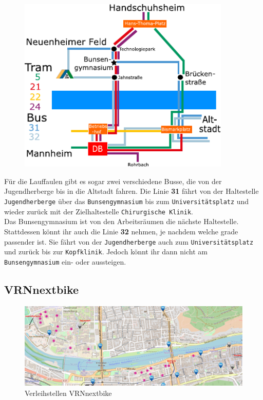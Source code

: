 \begin{figure}[t]
\centering
\includegraphics[width=0.9\textwidth]{media/vrn.pdf}
\end{figure}

Für die Lauffaulen gibt es sogar zwei verschiedene Busse, die von der Jugendherberge bis in die Altstadt fahren. Die Linie \textbf{31} fährt von der Haltestelle \texttt{Jugendherberge} über das \texttt{Bunsengymnasium} bis zum \texttt{Universitätsplatz} und wieder zurück mit der Zielhaltestelle \texttt{Chirurgische Klinik}.\\Das Bunsengymnasium ist von den Arbeitsräumen die nächste Haltestelle. Stattdessen könnt ihr auch die Linie \textbf{32} nehmen, je nachdem welche grade passender ist. Sie fährt von der \texttt{Jugendherberge} auch zum \texttt{Universitätsplatz} und zurück bis zur \texttt{Kopfklinik}. Jedoch könnt ihr dann nicht am \texttt{Bunsengymnasium} ein- oder aussteigen.

\subsection{VRNnextbike}

\begin{figure}[t]
  \includegraphics[width=1.0\textwidth]{chapters/heidelberg/nextbike}
  \caption*{Verleihstellen VRNnextbike}
  \label{nextbike}
\end{figure}

